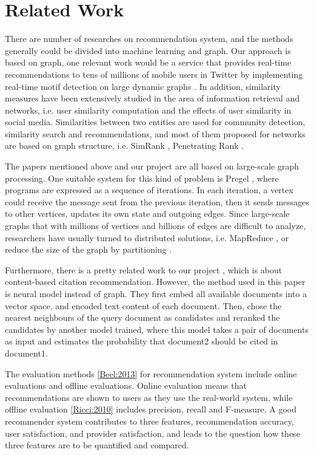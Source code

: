 \section{Related Work}

There are number of researches on recommendation system, and the methods generally could be divided into machine learning and graph. Our approach is based on graph, one relevant work would be 
a service that provides real-time recommendations to tens of millions of mobile users in Twitter by implementing real-time motif detection on large dynamic graphs \cite{Gupta:2014}. In addition, similarity measures \cite{Goel2013} have been extensively studied in the area of information retrieval and networks, i.e. user similarity computation and the effects of user similarity in social media. Similarities between two entities are used for community detection, similarity search and recommendations, and most of them proposed for networks are based on graph structure, i.e. SimRank \cite{Jeh:2002}, Penetrating Rank \cite{Zhao:2009}. 

The papers mentioned above and our project are all based on large-scale graph processing. One suitable system for this kind of problem is Pregel \cite{Malewicz:2010}, where programs are expressed as a sequence of iterations. In each iteration, a vertex could receive the message sent from the previous iteration, then it sends messages to other vertices, updates its own state and outgoing edges. Since large-scale graphs that with millions of vertices and billions of edges are difficult to analyze, researchers have usually turned to distributed solutions, i.e. MapReduce \cite{Lin:2010}, or reduce the size of the graph by partitioning \cite{Karypis:1998}.

Furthermore, there is a pretty related work to our project \cite{DBLP}, which is about content-based citation recommendation. However, the method used in this paper is neural model instead of graph. They first embed all available documents into a vector space, and encoded text content of each document. Then, chose the nearest neighbours of the query document as candidates and reranked the candidates by another model trained, where this model takes a pair of documents as input and estimates the probability that document2 should be cited in document1.

The evaluation methods \ref{Beel:2013} for recommendation system include online evaluations and offline evaluations. Online evaluation means that recommendations are shown to users as they use the real-world system, while offline evaluation \ref{Ricci:2010} includes precision, recall and F-measure. A good recommender system contributes to three features, recommendation accuracy, user satisfaction, and provider satisfaction, and leads to the question how these three features are to be quantified and compared.
